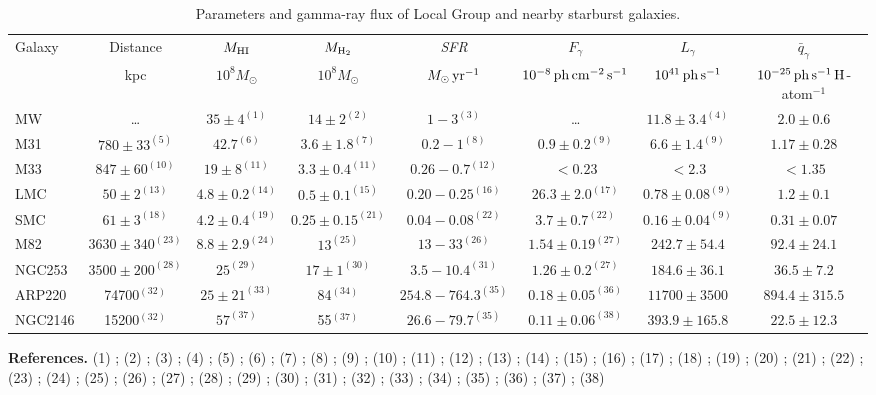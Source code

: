 \documentclass[useAMS,usenatbib,referee]{mn2e}
\begin{document}
\begin{table*}
\centering
\begin{center}
\caption{Parameters and gamma-ray flux of Local Group and nearby starburst galaxies.}
\begin{tabular}{lccccccc}
\hline\hline
Galaxy	 & Distance	 & $M_{\rm HI}$	  & $M_{\rm H_{2}}$	 & {\it SFR}			 & $F_{\gamma}$					 & $L_{\gamma}$			 & $\bar{q}_{\gamma}$ \\
& kpc	 & $10^8 M_{\odot}$ & $10^8 M_{\odot}$	 & $M_{\odot}\,{\rm yr^{-1}}$	 & $10^{-8}\,{\rm ph\,cm^{-2}\,s^{-1}}$	 & $10^{41}\,{\rm ph\,s^{-1}}$ & $10^{-25}\,{\rm ph\,s^{-1}\,H}$-atom$^{-1}$ \\
\hline
 MW  & \ldots        & $35\pm4^{(1)}$   & $14\pm2^{(2)}$ & $1-3^{(3)}$ & \ldots & $11.8\pm3.4^{(4)}$ & $2.0\pm0.6$ \\
 M31 & $780\pm33^{(5)}$ & $42.7^{(6)}$ & $3.6\pm1.8^{(7)}$ & $0.2-1^{(8)}$ & $0.9\pm0.2^{(9)}$ & $6.6\pm1.4^{(9)}$ & $1.17\pm0.28$  \\
 M33 & $847\pm60^{(10)}$ & $19\pm8^{(11)}$ & $3.3\pm0.4^{(11)}$ & $0.26-0.7^{(12)}$ & $<0.23$ & $<2.3$ & $<1.35$ \\
 LMC & $50\pm2^{(13)}$ & $4.8\pm0.2^{(14)}$ & $0.5\pm0.1^{(15)}$ & $0.20-0.25^{(16)}$ & $26.3\pm2.0^{(17)}$ & $0.78\pm0.08^{(9)}$ & $1.2\pm0.1$ \\
 SMC & $61\pm3^{(18)}$ & $4.2\pm0.4^{(19)}$ & $0.25\pm0.15^{(21)}$ & $0.04-0.08^{(22)}$ & $3.7\pm0.7^{(22)}$ & $0.16\pm0.04^{(9)}$ & $0.31\pm0.07$ \\
 M82 & $3630\pm340^{(23)}$ & $8.8\pm2.9^{(24)}$ & $13^{(25)}$ & $13-33^{(26)}$ & $1.54\pm0.19^{(27)}$ & $242.7\pm54.4$ & $92.4\pm24.1$\\
 NGC253 & $3500\pm200^{(28)}$ & $25^{(29)}$ & $17\pm1^{(30)}$ & $3.5-10.4^{(31)}$ & $1.26\pm0.2^{(27)}$ & $184.6\pm36.1$ & $36.5\pm7.2$\\
 ARP220& 74700$^{(32)}$ & $25\pm21^{(33)}$ & 84$^{(34)}$ & $254.8-764.3^{(35)}$ & $0.18\pm0.05^{(36)}$ & $11700\pm3500$ & $894.4\pm315.5$\\
 NGC2146& 15200$^{(32)}$ & $57^{(37)}$ & 55$^{(37)}$ & $26.6-79.7^{(35)}$ & $0.11\pm0.06^{(38)}$ & $393.9\pm165.8$ & $22.5\pm12.3$\\
\hline
\end{tabular}
\label{table1}
\end{center}
{\bf References.}
(1) \citet{pmg+2007}; (2) \citet{pmg+2007}; (3) \citet{yhp+2009}; (4) \citet{spd+2010}; (5) \citet{sg1998}; (6) \citet{ccf2009}; (7) \citet{nng+2006}; (8) \citet{yhp+2009,fgs+2013}; (9) \citet{aaa+2010c}; (10) \citet{gbf2004}; (11) \citet{gbr+2010}; (12) \citet{gbs+2007}; (13) \citet{ptg+2009}; (14) \citet{skc+2003}; (15) \citet{fkm+2008}; (16) \citet{hsk+2007}; (17) \citet{aaa+2010a}; (18) \citet{hhh2005}; (19) \citet{ssd+1999}; (20) \citet{lbs+2007}; (21) \citet{wkl+2004,blj+2011}; (22) \citet{aaa+2010b}; (23) \citet{kdg+2002}; (24) \citet{cly+2008}; (25) \citet{wws2002}; (26) \citet{fgl+2003}; (27) \citet{aaa+2012}; (28) \citet{rrm+2005}; (29) \citet{bof+2005}; (30) \citet{hwk+1997}; (31) \citet{lt2006}; (32) \citet{gs2004}; (33) \citet{bvs+1987}; (34) \citet{syb1997}; (35) \citet{ctr2005}; (36) \citet{pwl+2016}; (37) \citet{shl1995}; (38) \citet{twt2014}
\end{table*}
\end{document}

